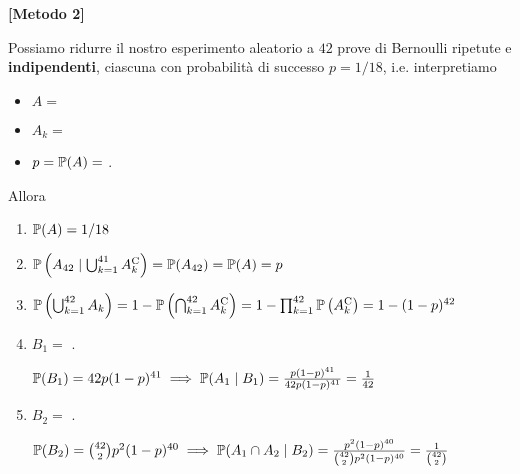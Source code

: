 \textbf{[Metodo 2]}

Possiamo ridurre il nostro esperimento aleatorio a $42$ prove di Bernoulli ripetute e \textbf{indipendenti}, ciascuna con probabilità di successo $p=1/18$, i.e. interpretiamo
\begin{itemize}
	\item $A=$ 
	\item $A_{k} =$ 
	\item $p=\mathbb{P}(A) =$ .
\end{itemize}
Allora
\begin{enumerate}
	\item $\mathbb{P}(A) =1/18$
	\item $\mathbb{P}\left(A_{42} \mid \bigcup_{k=1}^{41} A_{k}^{\mathrm{C}}\right) =\mathbb{P}(A_{42}) =\mathbb{P}(A) =p$
	\item $\mathbb{P}\left(\bigcup_{k=1}^{42} A_{k}\right) =1-\mathbb{P}\left(\bigcap_{k=1}^{42} A_{k}^{\mathrm{C}}\right) =1-\prod_{k=1}^{42}\mathbb{P}\left(A_{k}^{\mathrm{C}}\right) =1-(1-p)^{42}$
	\item $B_{1} =$ .

	$\mathbb{P}(B_{1}) =42p(1-p)^{41} \implies \mathbb{P}(A_{1} \mid B_{1}) =\frac{p(1-p)^{41}}{42p(1-p)^{41}} =\frac{1}{42}$
	\item $B_{2} =$ .

	$\mathbb{P}(B_{2}) =\binom{42}{2} p^{2}(1-p)^{40} \implies \mathbb{P}(A_{1} \cap A_{2} \mid B_{2}) =\frac{p^{2}(1-p)^{40}}{\binom{42}{2} p^{2}(1-p)^{40}} =\frac{1}{\binom{42}{2}}$
\end{enumerate}

\Soluzione

